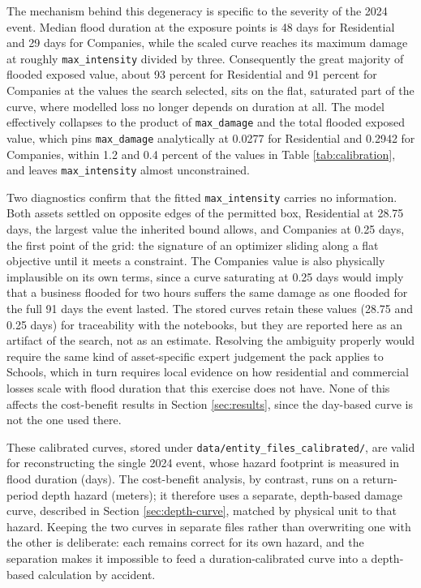 \documentclass[11pt]{article}
\begin{document}
The mechanism behind this degeneracy is specific to the severity of the 2024 event. Median
flood duration at the exposure points is 48 days for Residential and 29 days for Companies,
while the scaled curve reaches its maximum damage at roughly \texttt{max\_intensity}
divided by three. Consequently the great majority of flooded exposed value, about 93
percent for Residential and 91 percent for Companies at the values the search selected,
sits on the flat, saturated part of the curve, where modelled loss no longer depends on
duration at all. The model effectively collapses to the product of \texttt{max\_damage} and
the total flooded exposed value, which pins \texttt{max\_damage} analytically at 0.0277 for
Residential and 0.2942 for Companies, within 1.2 and 0.4 percent of the values in Table
\ref{tab:calibration}, and leaves \texttt{max\_intensity} almost unconstrained.

Two diagnostics confirm that the fitted \texttt{max\_intensity} carries no information. Both
assets settled on opposite edges of the permitted box, Residential at 28.75 days, the
largest value the inherited bound allows, and Companies at 0.25 days, the first point of
the grid: the signature of an optimizer sliding along a flat objective until it meets a
constraint. The Companies value is also physically implausible on its own terms, since a
curve saturating at 0.25 days would imply that a business flooded for two hours suffers the
same damage as one flooded for the full 91 days the event lasted. The stored curves retain
these values (28.75 and 0.25 days) for traceability with the notebooks, but they are
reported here as an artifact of the search, not as an estimate. Resolving the ambiguity
properly would require the same kind of asset-specific expert judgement the pack applies to
Schools, which in turn requires local evidence on how residential and commercial losses
scale with flood duration that this exercise does not have. None of this affects the
cost-benefit results in Section \ref{sec:results}, since the day-based curve is not the one
used there.

These calibrated curves, stored under \texttt{data/entity\_files\_calibrated/}, are valid
for reconstructing the single 2024 event, whose hazard footprint is measured in flood
duration (days). The cost-benefit analysis, by contrast, runs on a return-period depth
hazard (meters); it therefore uses a separate, depth-based damage curve, described in
Section \ref{sec:depth-curve}, matched by physical unit to that hazard. Keeping the two
curves in separate files rather than overwriting one with the other is deliberate: each
remains correct for its own hazard, and the separation makes it impossible to feed a
duration-calibrated curve into a depth-based calculation by accident.
\end{document}
